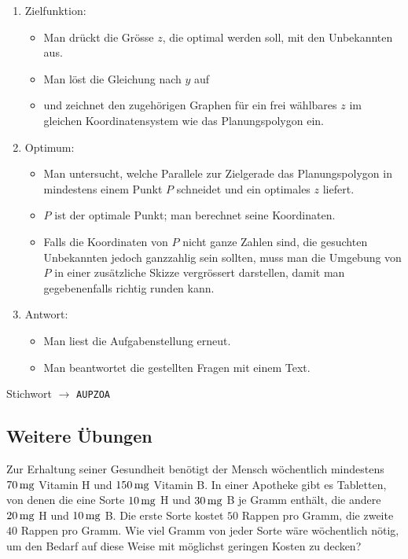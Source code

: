 \documentclass[%
11pt,%
twoside,%
titlepage,%
german,%
headsepline%
]{scrartcl}
\begin{document}
\begin{enumerate}
  \item Zielfunktion:
  \begin{itemize}
    \item Man dr\"uckt die Gr\"osse $z$, die optimal werden soll, mit
    den Unbekannten aus.
    \item Man l\"ost die Gleichung nach $y$ auf
    \item und zeichnet den zugeh\"origen Graphen f\"ur ein frei
    w\"ahlbares $z$ im gleichen Koordinatensystem wie das
    Planungspolygon ein.
  \end{itemize}
  \item Optimum:
  \begin{itemize}
    \item Man untersucht, welche Parallele zur Zielgerade das
    Planungspolygon in mindestens einem Punkt $P$ schneidet und ein
    optimales $z$ liefert.
    \item $P$ ist der optimale Punkt; man berechnet seine
    Koordinaten.
    \item Falls die Koordinaten von $P$ nicht ganze Zahlen sind, die
    gesuchten Unbekannten jedoch ganzzahlig sein sollten, muss man
    die Umgebung von $P$ in einer zus\"atzliche Skizze vergr\"ossert
    darstellen, damit man gegebenenfalls richtig runden kann.
  \end{itemize}
  \item Antwort:
  \begin{itemize}
    \item Man liest die Aufgabenstellung erneut.
    \item Man beantwortet die gestellten Fragen mit einem Text.
  \end{itemize}

\end{enumerate}

\begin{center}
Stichwort $\rightarrow$ \texttt{AUPZOA}
\end{center}

\subsection{Weitere \"Ubungen}
\begin{ueb}
  Zur Erhaltung seiner Gesundheit ben\"otigt der Mensch w\"ochentlich
  mindestens $\unit[70]{mg}$ Vitamin H und $\unit[150]{mg}$ Vitamin B. In einer
  Apotheke gibt es Tabletten, von denen die eine Sorte $\unit[10]{mg}$ H und
  $\unit[30]{mg}$ B je Gramm enth\"alt, die andere $\unit[20]{mg}$ H und $\unit[10]{mg}$ B.
  Die erste Sorte kostet $50$ Rappen pro Gramm, die zweite $40$
  Rappen pro Gramm. Wie viel Gramm von jeder Sorte w\"are w\"ochentlich
  n\"otig, um den Bedarf auf diese Weise mit m\"oglichst geringen Kosten
  zu decken?
\end{ueb}
\end{document}
